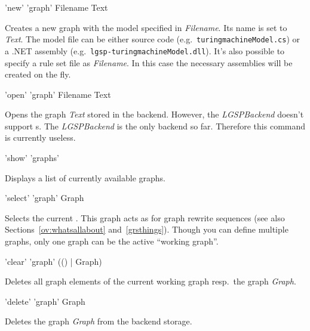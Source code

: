 \begin{rail}
  'new' 'graph' Filename Text 
\end{rail}
Creates a new graph with the model specified in \emph{Filename}. Its name is set to \emph{Text}. 
The model file can be either source code (e.g.\ \texttt{turing\textunderscore machineModel.cs}) or a .NET assembly (e.g.\ \texttt{lgsp-turing\textunderscore machineModel.dll}).
It's also possible to specify a rule set file as \emph{Filename}. 
In this case the necessary assemblies will be created on the fly.

\begin{rail}
  'open' 'graph' Filename Text
\end{rail}
Opens the graph \emph{Text} stored in the backend. However, the \emph{LGSPBackend} doesn't support s. The \emph{LGSPBackend} is the only backend so far. Therefore this command is currently useless.

\begin{rail}
  'show' 'graphs'
\end{rail}
Displays a list of currently available graphs.

\begin{rail}
  'select' 'graph' Graph
\end{rail}
Selects the current . This graph acts as \emph{} for graph rewrite sequences (see also Sections~\ref{ov:whatsallabout} and~\ref{grsthings}). Though you can define multiple graphs, only one graph can be the active ``working graph''.

\begin{rail}
  'clear' 'graph' (() | Graph)
\end{rail}
Deletes all graph elements of the current working graph resp.\ the graph \emph{Graph}.

\begin{rail}
  'delete' 'graph' Graph
\end{rail}
Deletes the graph \emph{Graph} from the backend storage.

